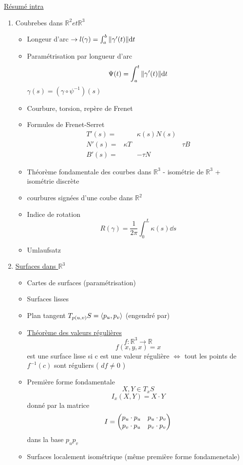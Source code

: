 \underline{Résumé intra} 

\renewcommand{\labelenumi}{\Roman{enumi}}


\begin{enumerate}
	\item Coubrebes dans $\mathbb{R}^{2} et \mathbb{R}^{3}$\begin{itemize}
		\item Longeur d'arc $\to l(\gamma)=\int_{a}^b \norm{\gamma'(t)} \dd t$ 
		\item Paramétrisation par longueur d'arc
			$$\Psi(t) = \int_{a}^t \norm{\gamma'(t)}\dd t$$ $\gamma(s) = (\gamma\circ\psi^{-1})(s)$ 
		\item Courbure, torsion, repère de Frenet
		\item Formules de Frenet-Serret $$\begin{matrix} T'(s)= & & \kappa(s)N(s) & \\ N'(s) = &\kappa T & & \tau B \\ B'(s) = & & -\tau N &	
		\end{matrix}$$ 
		\item Théorème fondamentale des courbes dans $\mathbb{R}^{3}$ - isométrie de $\mathbb{R}^{3} $  + isométrie discrète 
		\item courbures signées d'une coube dans $\mathbb{R}^{2} $ 
		\item Indice de rotation $$R(\gamma) = \frac{1}{2\pi} \int_{0}^L\kappa(s) \dd s$$ 
		\item Umlaufsatz
	\end{itemize} 
\item \underline{Surfaces dans $\mathbb{R}^{3}$ } \begin{itemize}
	\item Cartes de surfaces (paramétrisation)
	\item Surfaces lisses 
	\item Plan tangent $T_{p(u,v)} S = \left\langle p_{u}, p_{v} \right\rangle$ (engendré par) 
	\item \underline{Théorème des valeurs régulières} $$f:\mathbb{R}^{3} \to \mathbb{R}$$ $$f(x,y,x) = x$$ est une surface lisse si c est une valeur régulière $\iff$ tout les points de $f^{-1}(c)$ sont réguliers ( $df \neq 0$ )   
	\item Première forme fondamentale $$X,Y\in T_{x} S$$ $$I_{x} (X,Y) = X \cdot Y$$  donné par la matrice $$I = \begin{pmatrix} p_{u} \cdot p_{u} & p_{u} \cdot p_{v} \\ p_{v} \cdot p_{u} & p_{v} \cdot p_{v}  \end{pmatrix}$$ dans la base $p_{u} p_{v}$ 
	\item Surfaces localement isométrique (même première forme fondamenetale)
\end{itemize} 
\end{enumerate}









	

